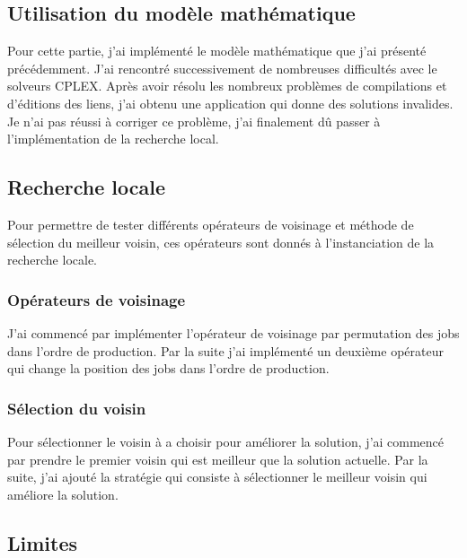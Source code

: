 \subsection{Utilisation du modèle mathématique}
Pour cette partie, j'ai implémenté le modèle mathématique que j'ai présenté précédemment.
J'ai rencontré successivement de nombreuses difficultés avec le solveurs CPLEX.
Après avoir résolu les nombreux problèmes de compilations et d'éditions des liens, j'ai obtenu une application qui donne des solutions invalides.
Je n'ai pas réussi à corriger ce problème, j'ai finalement dû passer à l'implémentation de la recherche local.

\subsection{Recherche locale}

Pour permettre de tester différents opérateurs de voisinage et méthode de sélection du meilleur voisin, 
ces opérateurs sont donnés  à l'instanciation de la recherche locale.

\subsubsection{Opérateurs de voisinage}
J'ai commencé par implémenter l'opérateur de voisinage par permutation des jobs dans l'ordre de production.
Par la suite j'ai implémenté un deuxième opérateur qui change la position des jobs dans l'ordre de production.

\subsubsection{Sélection du voisin}
Pour sélectionner le voisin à a choisir pour améliorer la solution, j'ai commencé par prendre le premier voisin qui est meilleur que la solution actuelle.
Par la suite, j'ai ajouté la stratégie qui consiste à sélectionner le meilleur voisin qui améliore la solution.


\subsection{Limites}

